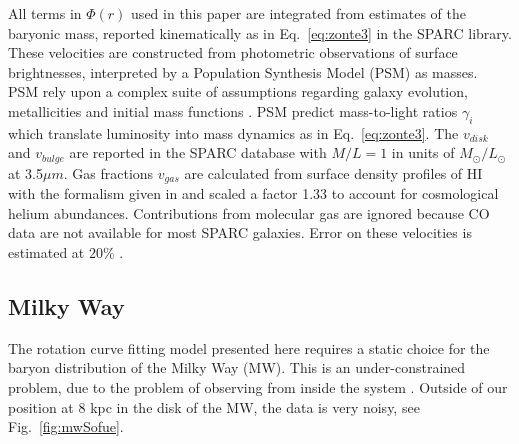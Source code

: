 \documentclass[reprint,%
 amsmath,amssymb,
 aps,
]{revtex4-1}
\begin{document}
   
     All terms in $\Phi(r)$ used in this paper  are    integrated from estimates of the baryonic mass, reported kinematically as in Eq.~\ref{eq:zonte3} in the      SPARC  library.   These velocities  are constructed from photometric observations of surface brightnesses, interpreted   by a Population Synthesis Model (PSM)\cite{10.1093/mnras/sty3223} as     masses. 
PSM rely upon a complex  suite of  assumptions regarding galaxy evolution, metallicities and initial mass functions  \cite{BelldYong,10.1093/mnras/sty3223}. PSM predict   mass-to-light ratios  $\gamma_i$
 which translate  luminosity into mass dynamics as in Eq.~\ref{eq:zonte3}. 
     The $v_{disk}$ and $v_{bulge}$ are reported in the SPARC database with $ M/L = 1$ in units of  $M_{\odot} / L_{\odot}$   at 3.5$\mu m$.
     Gas fractions $v_{gas}$ are calculated from surface density profiles of HI  with the formalism given in  \cite{1983MNRAS.203..735C} and scaled 
     a factor 1.33 to account for cosmological helium abundances.  
     Contributions from molecular gas are ignored   because CO data are not available for most SPARC galaxies. 
     Error on these velocities is estimated at $20\%$ \cite{2016Lelli}. 
     
      
  
 

  
 


\subsection{Milky Way}
The rotation curve fitting model presented here requires a static choice for the baryon distribution of the   Milky Way (MW).   This is an under-constrained problem, due to  the    problem of observing from       inside  the system  \cite{1991ARA&A..29..409F}.
 Outside of our position at 8 kpc in the disk of the MW, the data is very 
 noisy, see  Fig.~\ref{fig:mwSofue}.
 
\end{document}
